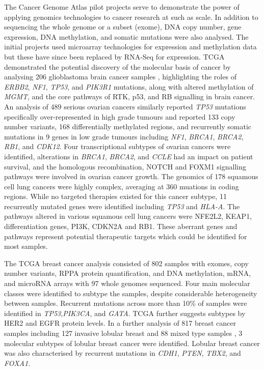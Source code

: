  \label{TCGA_Findings}

The Cancer Genome Atlas pilot projects \citep{TCGA2008GBM, TCGA2011OV, TCGA2012LUSC} serve to demonstrate the power of applying \gls{genomics} technologies to cancer research at such as scale. In addition to sequencing the whole genome or a subset (exome), DNA copy number, gene expression, DNA methylation, and somatic mutations were also analysed. The initial projects used microarray technologies for expression and methylation data but these have since been replaced by \gls{RNA-Seq} for expression. \gls{TCGA} demonstrated the potential discovery of the molecular basis of cancer by analysing 206 glioblastoma brain cancer samples \citep{TCGA2008GBM}, highlighting the roles of \textit{ERBB2}, \textit{NF1}, \textit{TP53}, and \textit{PIK3R1} mutations, along with altered methylation of \textit{MGMT}, and the core pathways of RTK, p53, and RB signalling in brain cancer.  An analysis of 489 serious ovarian cancers \citep{TCGA2011OV} similarly reported \textit{TP53} mutations specifically over-represented in high grade tumours and reported 133 copy number variants, 168 differentially methylated regions, and recurrently somatic mutations in 9 genes in low grade tumours including \textit{NF1},  \textit{BRCA1}, \textit{BRCA2}, \textit{RB1}, and \textit{CDK12}. Four transcriptional subtypes of ovarian cancers were identified, alterations in \textit{BRCA1}, \textit{BRCA2}, and \textit{CCLE} had an impact on patient survival, and the homologous recombination, NOTCH and FOXM1 signalling pathways were involved in ovarian cancer growth. The \gls{genomics} of 178 squamous cell lung cancers \citep{TCGA2012LUSC} were highly complex, averaging at 360 muations in coding regions. While no targeted therapies existed for this cancer subtype, 11 recurrently mutated genes were identified including \textit{TP53} and \textit{HLA-A}. The pathways altered in various squamous cell lung cancers were NFE2L2, KEAP1, differentiation genes, PI3K, CDKN2A and RB1. These aberrant genes and pathways represent potential therapeutic targets which could be identified for most samples.

The \gls{TCGA} breast cancer analysis \citep{TCGA2012} consisted of 802 samples with exomes, copy number variants, RPPA protein quantification, and DNA methylation, mRNA, and microRNA arrays with 97 whole genomes sequenced. Four main molecular classes were identified to subtype the samples, despite considerable heterogeneity between samples. Recurrent mutations across more than 10\% of samples were identified in \textit{TP53},\textit{PIK3CA}, and \textit{GATA}. \gls{TCGA} further suggests subtypes by HER2 and EGFR protein levels. In a further analysis of 817 breast cancer samples including 127 invasive lobular breast and 88 mixed type samples \citep{TCGA2015LBC}, 3 molecular subtypes of lobular breast cancer were identified. Lobular breast cancer was also characterised by recurrent mutations in \textit{CDH1}, \textit{PTEN}, \textit{TBX2}, and \textit{FOXA1}.

